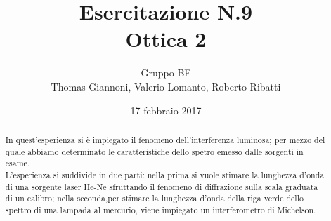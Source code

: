 \documentclass[11pt,a4paper]{article}
\author{Gruppo BF \\ \smallskip Thomas Giannoni, Valerio Lomanto, Roberto Ribatti}
\title{Esercitazione N.9 \\ \smallskip Ottica 2}
\date{17 febbraio 2017}
\begin{document}
\maketitle

\begin{abstract}
In quest'esperienza si è impiegato il fenomeno dell'interferenza luminosa;
per mezzo del quale abbiamo determinato le caratteristiche dello spetro emesso dalle sorgenti in esame.
\\L'esperienza si suddivide in due parti: nella prima si vuole stimare
la lunghezza d'onda di una sorgente laser He-Ne sfruttando il fenomeno di diffrazione sulla scala
graduata di un calibro; nella seconda,per stimare la lunghezza d'onda della riga verde dello
spettro di una lampada al mercurio, viene impiegato un interferometro di
Michelson.
\end{abstract}








\end{document}
